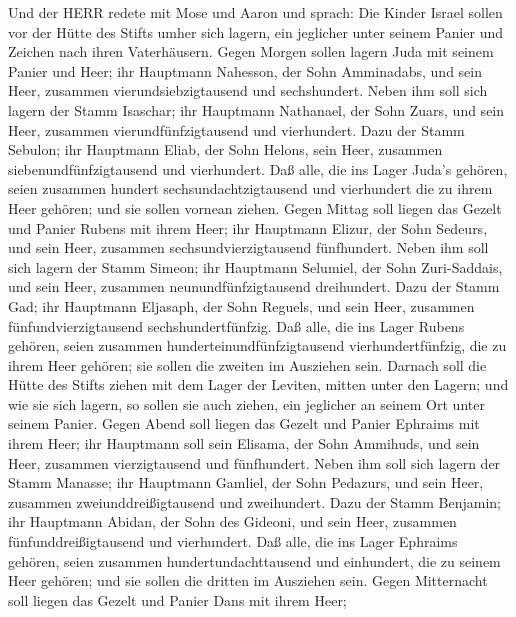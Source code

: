  Und der HERR redete mit Mose und Aaron und sprach:
 Die Kinder Israel sollen vor der Hütte des Stifts umher
sich lagern, ein jeglicher unter seinem Panier und Zeichen nach ihren
Vaterhäusern.  Gegen Morgen sollen lagern Juda mit seinem
Panier und Heer; ihr Hauptmann Nahesson, der Sohn Amminadabs,
 und sein Heer, zusammen vierundsiebzigtausend und
sechshundert.  Neben ihm soll sich lagern der Stamm
Isaschar; ihr Hauptmann Nathanael, der Sohn Zuars,  und sein
Heer, zusammen vierundfünfzigtausend und vierhundert.  Dazu
der Stamm Sebulon; ihr Hauptmann Eliab, der Sohn Helons, 
sein Heer, zusammen siebenundfünfzigtausend und vierhundert.
 Daß alle, die ins Lager Juda's gehören, seien zusammen
hundert sechsundachtzigtausend und vierhundert die zu ihrem Heer
gehören; und sie sollen vornean ziehen.  Gegen Mittag soll
liegen das Gezelt und Panier Rubens mit ihrem Heer; ihr Hauptmann
Elizur, der Sohn Sedeurs,  und sein Heer, zusammen
sechsundvierzigtausend fünfhundert.  Neben ihm soll sich
lagern der Stamm Simeon; ihr Hauptmann Selumiel, der Sohn Zuri-Saddais,
 und sein Heer, zusammen neunundfünfzigtausend dreihundert.
 Dazu der Stamm Gad; ihr Hauptmann Eljasaph, der Sohn
Reguels,  und sein Heer, zusammen fünfundvierzigtausend
sechshundertfünfzig.  Daß alle, die ins Lager Rubens
gehören, seien zusammen hunderteinundfünfzigtausend vierhundertfünfzig,
die zu ihrem Heer gehören; sie sollen die zweiten im Ausziehen sein.
 Darnach soll die Hütte des Stifts ziehen mit dem Lager der
Leviten, mitten unter den Lagern; und wie sie sich lagern, so sollen sie
auch ziehen, ein jeglicher an seinem Ort unter seinem Panier.
 Gegen Abend soll liegen das Gezelt und Panier Ephraims mit
ihrem Heer; ihr Hauptmann soll sein Elisama, der Sohn Ammihuds,
 und sein Heer, zusammen vierzigtausend und fünfhundert.
 Neben ihm soll sich lagern der Stamm Manasse; ihr
Hauptmann Gamliel, der Sohn Pedazurs,  und sein Heer,
zusammen zweiunddreißigtausend und zweihundert.  Dazu der
Stamm Benjamin; ihr Hauptmann Abidan, der Sohn des Gideoni,
 und sein Heer, zusammen fünfunddreißigtausend und
vierhundert.  Daß alle, die ins Lager Ephraims gehören,
seien zusammen hundertundachttausend und einhundert, die zu seinem Heer
gehören; und sie sollen die dritten im Ausziehen sein. 
Gegen Mitternacht soll liegen das Gezelt und Panier Dans mit ihrem Heer;
